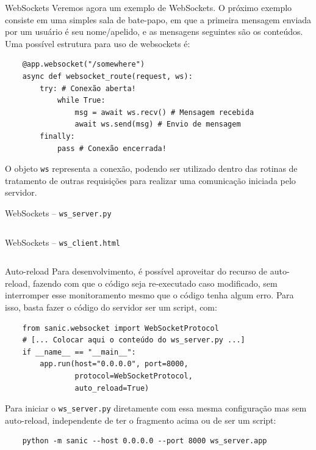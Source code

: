 \documentclass[utf8]{beamer}
\begin{document}
\begin{frame}[fragile]{WebSockets}
  Veremos agora um exemplo de WebSockets.
  O próximo exemplo consiste em uma simples sala de bate-papo,
  em que a primeira mensagem enviada por um usuário é seu nome/apelido,
  e as mensagens seguintes são os conteúdos.
  \vfill
  Uma possível estrutura para uso de websockets é:
  \begin{verbatim}
    @app.websocket("/somewhere")
    async def websocket_route(request, ws):
        try: # Conexão aberta!
            while True:
                msg = await ws.recv() # Mensagem recebida
                await ws.send(msg) # Envio de mensagem
        finally:
            pass # Conexão encerrada!
  \end{verbatim}
  \vfill
  O objeto \texttt{ws} representa a conexão,
  podendo ser utilizado
  dentro das rotinas de tratamento de outras requisições
  para realizar uma comunicação iniciada pelo servidor.
\end{frame}


\begin{frame}[fragile]{WebSockets -- \texttt{ws\_server.py}}
  \inputminted{python}{ws_server.py}
\end{frame}


\begin{frame}[fragile]{WebSockets -- \texttt{ws\_client.html}}
  \inputminted{html}{ws_client.html}
\end{frame}


\begin{frame}[fragile]{Auto-reload}
  Para desenvolvimento,
  é possível aproveitar do recurso de auto-reload,
  fazendo com que o código seja re-executado caso modificado,
  sem interromper esse monitoramento
  mesmo que o código tenha algum erro.
  Para isso, basta fazer o código do servidor ser um script, com:
  \begin{verbatim}
    from sanic.websocket import WebSocketProtocol
    # [... Colocar aqui o conteúdo do ws_server.py ...]
    if __name__ == "__main__":
        app.run(host="0.0.0.0", port=8000,
                protocol=WebSocketProtocol,
                auto_reload=True)
  \end{verbatim}
  \vfill
  Para iniciar o \texttt{ws\_server.py} diretamente
  com essa mesma configuração mas sem auto-reload,
  independente de ter o fragmento acima ou de ser um script:
  \begin{verbatim}
    python -m sanic --host 0.0.0.0 --port 8000 ws_server.app
  \end{verbatim}
\end{frame}
\end{document}
